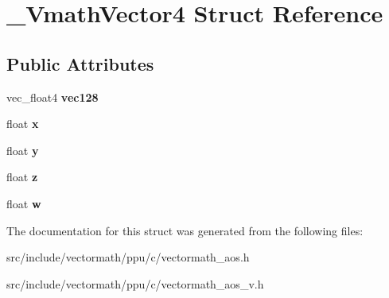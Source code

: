 \hypertarget{struct__VmathVector4}{\section{\-\_\-\-Vmath\-Vector4 Struct Reference}
\label{struct__VmathVector4}
}
\subsection*{Public Attributes}
\begin{DoxyCompactItemize}
\item 
\hypertarget{struct__VmathVector4_abf6000c4af358cfc99318f2621d600ca}{vec\-\_\-float4 {\bfseries vec128}}\label{struct__VmathVector4_abf6000c4af358cfc99318f2621d600ca}

\item 
\hypertarget{struct__VmathVector4_a96a079668fb45fadde5fcc2e3e8b3bc6}{float {\bfseries x}}\label{struct__VmathVector4_a96a079668fb45fadde5fcc2e3e8b3bc6}

\item 
\hypertarget{struct__VmathVector4_a6f60c4d7dd212e85bc299b622f74eee9}{float {\bfseries y}}\label{struct__VmathVector4_a6f60c4d7dd212e85bc299b622f74eee9}

\item 
\hypertarget{struct__VmathVector4_a1480016f839d33dc7f4ac71afd4089ea}{float {\bfseries z}}\label{struct__VmathVector4_a1480016f839d33dc7f4ac71afd4089ea}

\item 
\hypertarget{struct__VmathVector4_a1f7c514062c6c35e7200a55b98824409}{float {\bfseries w}}\label{struct__VmathVector4_a1f7c514062c6c35e7200a55b98824409}

\end{DoxyCompactItemize}


The documentation for this struct was generated from the following files\-:\begin{DoxyCompactItemize}
\item 
src/include/vectormath/ppu/c/vectormath\-\_\-aos.\-h\item 
src/include/vectormath/ppu/c/vectormath\-\_\-aos\-\_\-v.\-h\end{DoxyCompactItemize}
